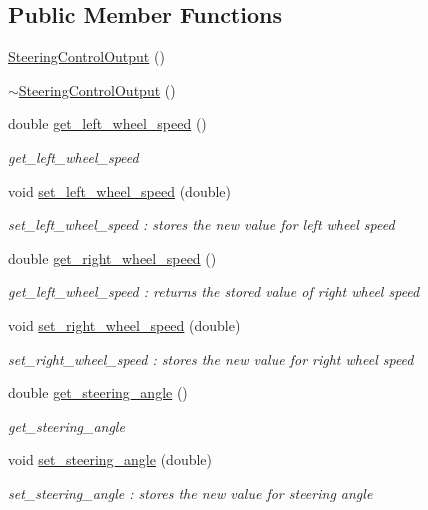 \subsection*{Public Member Functions}
\begin{DoxyCompactItemize}
\item 
\hyperlink{classSteeringControlOutput_a7e9875f06445d4e8b9773b5507755fd6}{Steering\+Control\+Output} ()
\item 
\hyperlink{classSteeringControlOutput_a2c068ac47368fae97f2a66fd11655372}{$\sim$\+Steering\+Control\+Output} ()
\item 
double \hyperlink{classSteeringControlOutput_af49e9f149fbdf2a5266e432acf9f81be}{get\+\_\+left\+\_\+wheel\+\_\+speed} ()
\begin{DoxyCompactList}\small\item\em get\+\_\+left\+\_\+wheel\+\_\+speed \end{DoxyCompactList}\item 
void \hyperlink{classSteeringControlOutput_a79f350659080a988e4df4174f849b98e}{set\+\_\+left\+\_\+wheel\+\_\+speed} (double)
\begin{DoxyCompactList}\small\item\em set\+\_\+left\+\_\+wheel\+\_\+speed \+: stores the new value for left wheel speed \end{DoxyCompactList}\item 
double \hyperlink{classSteeringControlOutput_a44153ca072242f333327dd36dd358b88}{get\+\_\+right\+\_\+wheel\+\_\+speed} ()
\begin{DoxyCompactList}\small\item\em get\+\_\+left\+\_\+wheel\+\_\+speed \+: returns the stored value of right wheel speed \end{DoxyCompactList}\item 
void \hyperlink{classSteeringControlOutput_af714d4bfb1234cf4b44e1231ed181da2}{set\+\_\+right\+\_\+wheel\+\_\+speed} (double)
\begin{DoxyCompactList}\small\item\em set\+\_\+right\+\_\+wheel\+\_\+speed \+: stores the new value for right wheel speed \end{DoxyCompactList}\item 
double \hyperlink{classSteeringControlOutput_a8d39c27f9056b1c887c2efa1698a7d8f}{get\+\_\+steering\+\_\+angle} ()
\begin{DoxyCompactList}\small\item\em get\+\_\+steering\+\_\+angle \end{DoxyCompactList}\item 
void \hyperlink{classSteeringControlOutput_a6dcbb32a6b426b785045fb3ddb17a840}{set\+\_\+steering\+\_\+angle} (double)
\begin{DoxyCompactList}\small\item\em set\+\_\+steering\+\_\+angle \+: stores the new value for steering angle \end{DoxyCompactList}\end{DoxyCompactItemize}
